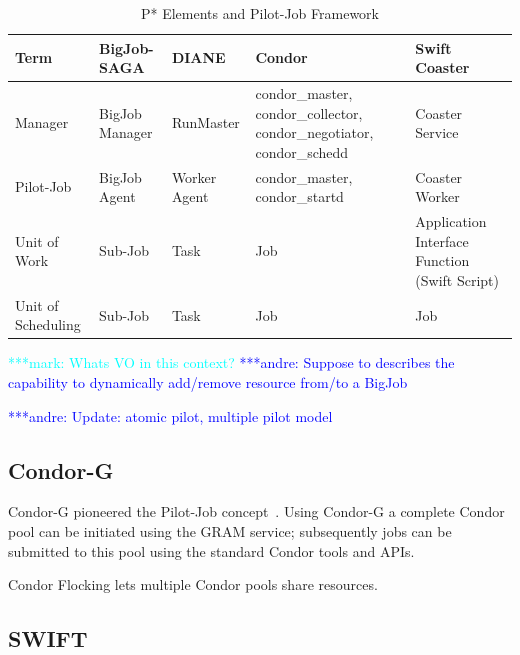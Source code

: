 \documentclass[conference,final]{IEEEtran}
\newcommand{\jhanote}[1]{ {\textcolor{red} { ***shantenu: #1 }}}
\newcommand{\alnote}[1]{ {\textcolor{blue} { ***andre: #1 }}}
\newcommand{\msnote}[1]{ {\textcolor{cyan} { ***mark: #1 }}}
\newcommand{\alnote}[1]{}
\newcommand{\jhanote}[1]{}
\newcommand{\msnote}[1]{}
\begin{document}
\begin{table}[t]
\centering
\begin{tabular}{|p{2.5cm}|p{3cm}|p{3cm}|p{3cm}|p{3cm}|}
\hline
\textbf{Term} &\textbf{BigJob-SAGA} &\textbf{DIANE} &\textbf{Condor} 
&\textbf{Swift Coaster}  \\
\hline
Manager &BigJob Manager & RunMaster & condor\_master, condor\_collector, condor\_negotiator, condor\_schedd &Coaster Service\\ 
\hline
Pilot-Job &BigJob Agent  & Worker Agent &condor\_master, condor\_startd &Coaster Worker\\
\hline
Unit of Work &Sub-Job &Task &Job &Application Interface Function (Swift Script)\\
\hline
Unit of Scheduling &Sub-Job &Task &Job &Job\\
\hline
\end{tabular}
\caption{P* Elements and Pilot-Job Framework} \label{table:bigjob-saga-diane}
\end{table}

\msnote{Whats VO in this context?}\alnote{Suppose to describes the capability to dynamically add/remove resource from/to a BigJob}


\alnote{Update: atomic pilot, multiple pilot model}





\subsection{Condor-G}

Condor-G pioneered the Pilot-Job concept~\cite{condor-g}. Using Condor-G 
a complete Condor pool can be initiated using the GRAM service; subsequently 
jobs can be submitted to this pool using the standard Condor tools and APIs.

Condor Flocking lets multiple Condor pools share resources.


\subsection{SWIFT}
\end{document}
